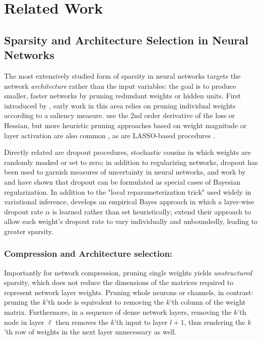 
\section{Related Work}
\label{sec:ch3-related}

\subsection{Sparsity and Architecture Selection in Neural Networks}
\label{subsec:ch3-arch}

The most extensively studied form of sparsity in neural networks
targets the network \emph{architecture} rather than the input
variables: the goal is to produce smaller, faster networks by
pruning redundant weights or hidden units.  First introduced by \citet{lecun_optimal_1989}, early work in this area relies on pruning individual weights according to a saliency measure.  \citet{lecun_optimal_1989, hassibi_second_1992} use the 2nd order derivative of the loss or Hessian, but more heuristic pruning approaches based on weight magnitude or layer activation are also common \citep{han_learning_2015}, as are LASSO-based procedures \citep{lemhadri_lassonet_2021, thompson_contextual_2024}.

Directly related are dropout procedures, stochastic cousins in which weights are randomly masked or set to zero; in addition to regularizing networks, dropout has been used to garnish measures of uncertainty in neural networks, and work by \citep{kingma_variational_2015} and \citep{gal_dropout_2016} have shown that dropout can be formulated as special cases of Bayesian regularization.  In addition to the "local reparameterization trick" used widely in variational inference, \citep{kingma_variational_2015} develops an empirical Bayes approach in which a layer-wise dropout rate $\alpha$ is learned rather than set heuristically; \citet{molchanov_variational_2017} extend their approach to allow each weight's dropout rate to vary individually and unboundedly, leading to greater sparsity.

\subsubsection*{Compression and Architecture selection:}
Importantly for network compression, pruning single weights yields
\emph{unstructured} sparsity, which does not reduce the dimensions of the matrices required to represent network layer weights.  Pruning whole neurons or channels, in contrast: pruning the $k$'th node is equivalent to removing the $k$'th column of the weight matrix.  Furthermore, in a sequence of dense network layers, removing the $k$'th node in layer $\ell$ then removes the $k$'th input to layer $l+1$, thus rendering the $k$'th row of weights in the next layer unnecessary as well.  


